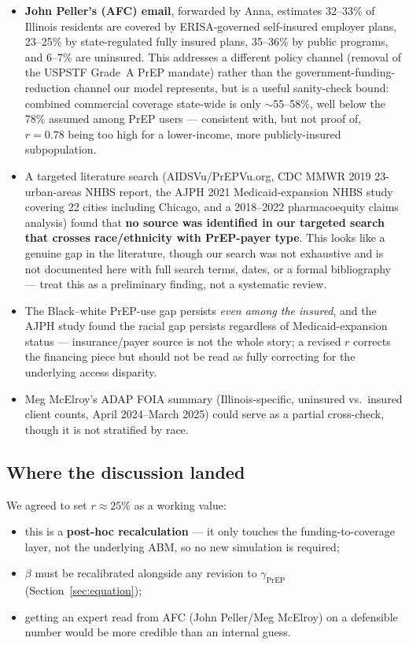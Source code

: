 \documentclass[12pt]{article}
\begin{document}
\begin{itemize}
  \item \textbf{John Peller's (AFC) email}, forwarded by Anna, estimates
    32--33\% of Illinois residents are covered by ERISA-governed
    self-insured employer plans, 23--25\% by state-regulated fully insured
    plans, 35--36\% by public programs, and 6--7\% are uninsured. This
    addresses a different policy channel (removal of the USPSTF Grade~A
    PrEP mandate) rather than the government-funding-reduction channel our
    model represents, but is a useful sanity-check bound: combined
    commercial coverage state-wide is only $\sim$55--58\%, well below the
    78\% assumed among PrEP users --- consistent with, but not proof of,
    $r=0.78$ being too high for a lower-income, more publicly-insured
    subpopulation.
  \item A targeted literature search (AIDSVu/PrEPVu.org, CDC MMWR 2019
    23-urban-areas NHBS report, the AJPH 2021 Medicaid-expansion NHBS study
    covering 22 cities including Chicago, and a 2018--2022 pharmacoequity
    claims analysis) found that \textbf{no source was identified in our
    targeted search that crosses race/ethnicity with PrEP-payer type}. This
    looks like a genuine gap in the literature, though our search was not
    exhaustive and is not documented here with full search terms, dates, or
    a formal bibliography --- treat this as a preliminary finding, not a
    systematic review.
  \item The Black--white PrEP-use gap persists \emph{even among the
    insured}, and the AJPH study found the racial gap persists regardless
    of Medicaid-expansion status --- insurance/payer source is not the
    whole story; a revised $r$ corrects the financing piece but should not
    be read as fully correcting for the underlying access disparity.
  \item Meg McElroy's ADAP FOIA summary (Illinois-specific, uninsured vs.\
    insured client counts, April 2024--March 2025) could serve as a
    partial cross-check, though it is not stratified by race.
\end{itemize}

\subsection{Where the discussion landed}

We agreed to set $r \approx 25\%$ as a working value:
\begin{itemize}
  \item this is a \textbf{post-hoc recalculation} --- it only touches the
    funding-to-coverage layer, not the underlying ABM, so no new simulation
    is required;
  \item $\beta$ must be recalibrated alongside any revision to
    $\gamma_{\text{PrEP}}$ (Section~\ref{sec:equation});
  \item getting an expert read from AFC (John Peller/Meg McElroy) on a
    defensible number would be more credible than an internal guess.
\end{itemize}
\end{document}
